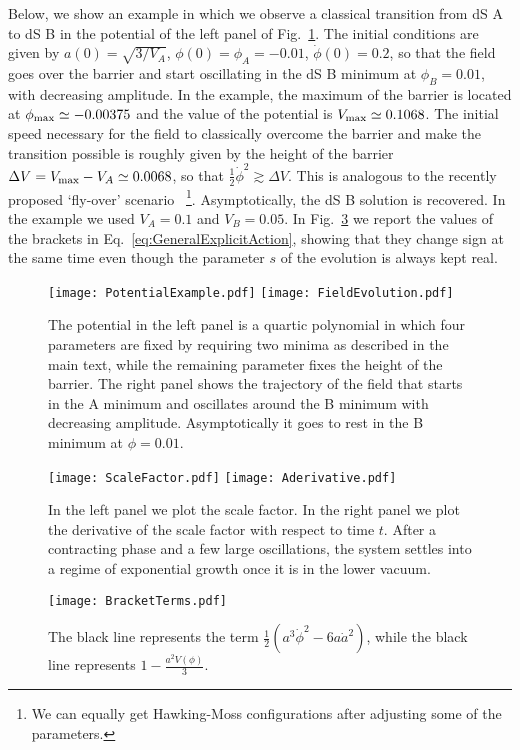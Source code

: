 \documentclass[a4paper,11pt]{article}
\numberwithin{equation}{section}
\begin{document}
\begin{itemize}
Below, we show an example in which we observe a classical transition from dS A to dS B in the potential of the left panel of Fig.~\ref{fig:PotentialExample}. The initial conditions are given by $a(0) = \sqrt{3/V_A}$, $\phi(0) = \phi_A = -0.01$, $\dot\phi(0) = 0.2$, so that the field goes over the barrier and start oscillating in the dS B minimum at $\phi_B = 0.01$, with decreasing amplitude. In the example, the maximum of the barrier is located at $\phi_{\rm max} \simeq -0.00375$ and the value of the potential is $V_{\rm max} \simeq 0.1068$. The initial speed necessary for the field to classically overcome the barrier and make the transition possible is roughly given by the height of the barrier $\Delta V = V_{\rm max} - V_A \simeq 0.0068$, so that $\frac{1}{2} \dot\phi^{2} \gtrsim \Delta V$. This is analogous to the recently proposed ‘fly-over’ scenario~\cite{Blanco-Pillado:2019xny} \footnote{We can equally get Hawking-Moss configurations after adjusting some of the parameters.}. Asymptotically, the dS B solution is recovered. In the example we used $V_A = 0.1$ and $V_B = 0.05$. In Fig.~\ref{fig:BracketTerms} we report the values of the brackets in Eq.~\eqref{eq:GeneralExplicitAction}, showing that they change sign at the same time even though the parameter $s$ of the evolution is always kept real.
\begin{figure}[h!] 
\begin{center} 
\texttt{[image: PotentialExample.pdf]} \qquad
\texttt{[image: FieldEvolution.pdf]}
\caption{\footnotesize{The potential in the left panel is a quartic polynomial in which four parameters are fixed by requiring two minima as described in the main text, while the remaining parameter fixes the height of the barrier. The right panel shows the trajectory of the field that starts in the A minimum and oscillates around the B minimum with decreasing amplitude. Asymptotically it goes to rest in the B minimum at $\phi = 0.01$.} \label{fig:PotentialExample}}
\end{center} 
\end{figure}
\begin{figure}[h!] 
\begin{center} 
\texttt{[image: ScaleFactor.pdf]} \qquad
\texttt{[image: Aderivative.pdf]}
\caption{\footnotesize{In the left panel we plot the scale factor. In the right panel we plot the derivative of the scale factor with respect to time $t$. After a contracting phase and a few large oscillations, the system settles into a regime of exponential growth once it is in the lower vacuum. } \label{fig:ScaleFactors}}
\end{center} 
\end{figure}
\begin{figure}[h!] 
\begin{center} 
\texttt{[image: BracketTerms.pdf]} 
\caption{\footnotesize{The black line represents the term $\frac{1}{2} \left(a^3 \dot\phi^2 - 6 a \dot{a}^2\right)$, while the black line represents $1- \frac{a^2 V(\phi)}{3}$.}\label{fig:BracketTerms}}
\end{center} 
\end{figure}



\end{itemize}
\end{document}

